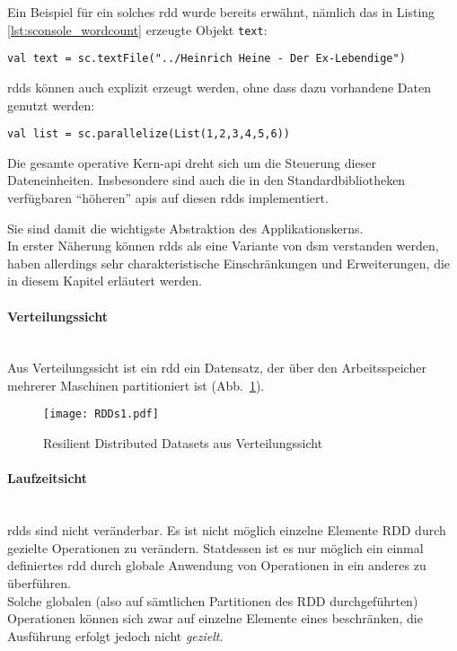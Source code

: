 Ein Beispiel für ein solches \gls{rdd} wurde bereits erwähnt, nämlich das in Listing \ref{lst:sconsole_wordcount} erzeugte Objekt \lstinline|text|:\\

\begin{lstlisting}
val text = sc.textFile("../Heinrich Heine - Der Ex-Lebendige")
\end{lstlisting}

\Glspl{rdd} können auch explizit erzeugt werden, ohne dass dazu vorhandene Daten genutzt werden:\\

\begin{lstlisting}
val list = sc.parallelize(List(1,2,3,4,5,6))
\end{lstlisting}

Die gesamte operative Kern-\gls{api} dreht sich um die Steuerung dieser Dateneinheiten. Insbesondere sind auch die in den Standardbibliotheken verfügbaren "`höheren"' \glspl{api} auf diesen \glspl{rdd} implementiert.

Sie sind damit die wichtigste Abstraktion des Applikationskerns.\\

In erster Näherung können \glspl{rdd} als eine Variante von \gls{dsm}\cite{Nitzberg:1991:DSM:112827.112855} \cite{Mat12} verstanden werden, haben allerdings sehr charakteristische Einschränkungen und Erweiterungen, die in diesem Kapitel erläutert werden.\\

\paragraph{Verteilungssicht}\\

Aus Verteilungssicht ist ein \gls{rdd} ein Datensatz, der über den Arbeitsspeicher mehrerer Maschinen partitioniert ist (Abb.~\ref{fig:rdds1}).

\begin{figure}[ht!]
	\centering
  \texttt{[image: RDDs1.pdf]}
	\caption{Resilient Distributed Datasets aus Verteilungssicht}
	\label{fig:rdds1}
\end{figure}

\paragraph{Laufzeitsicht}\\

\Glspl{rdd} sind nicht veränderbar. Es ist nicht möglich einzelne Elemente \gls{RDD} durch gezielte Operationen zu verändern. Statdessen ist es nur möglich ein einmal definiertes \gls{rdd} durch globale Anwendung von Operationen in ein anderes zu überführen.\\
Solche globalen (also auf sämtlichen Partitionen des \gls{RDD} durchgeführten) Operationen können sich zwar auf einzelne Elemente eines beschränken, die Ausführung erfolgt jedoch nicht \textit{gezielt}.

